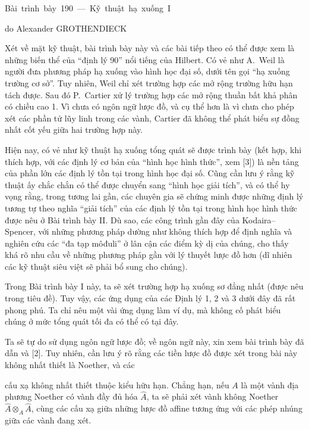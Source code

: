 \unit{Bài trình bày 190 — Kỹ thuật hạ xuống I}
%
  {do Alexander GROTHENDIECK}

Xét về mặt kỹ thuật, bài trình bày này và các bài tiếp theo có thể được xem là
những biến thể của ``định lý 90'' nổi tiếng của Hilbert. Có vẻ như A.~Weil là
người đưa phương pháp hạ xuống vào hình học đại số, dưới tên gọi ``hạ xuống
trường cơ sở''. Tuy nhiên, Weil chỉ xét trường hợp các mở rộng trường hữu hạn
tách được. Sau đó P.~Cartier xử lý trường hợp các mở rộng thuần bất khả phân có
chiều cao 1. Vì chưa có ngôn ngữ lược đồ, và cụ thể hơn là vì chưa cho phép xét
các phần tử lũy linh trong các vành, Cartier đã không thể phát biểu sự đồng nhất
cốt yếu giữa hai trường hợp này.

Hiện nay, có vẻ như kỹ thuật hạ xuống tổng quát sẽ được trình bày (kết hợp, khi
thích hợp, với các định lý cơ bản của ``hình học hình thức'', xem [3]) là nền
tảng của phần lớn các định lý tồn tại trong hình học đại số. Cũng cần lưu ý rằng
kỹ thuật ấy chắc chắn có thể được chuyển sang ``hình học giải tích'', và có thể
hy vọng rằng, trong tương lai gần, các chuyên gia sẽ chứng minh được những định
lý tương tự theo nghĩa ``giải tích'' của các định lý tồn tại trong hình học
hình thức được nêu ở Bài trình bày II. Dù sao, các công trình gần đây của Kodaira--Spencer,
với những phương pháp dường như không thích hợp để định nghĩa và nghiên cứu các
``đa tạp môđuli'' ở lân cận các điểm kỳ dị của chúng, cho thấy khá rõ nhu cầu về
những phương pháp gần với lý thuyết lược đồ hơn (dĩ nhiên các kỹ thuật siêu việt
sẽ phải bổ sung cho chúng).

Trong Bài trình bày I này, ta sẽ xét trường hợp hạ xuống sơ đẳng nhất (được nêu
trong tiêu đề). Tuy vậy, các ứng dụng của các Định lý 1, 2 và 3 dưới đây đã rất
phong phú. Ta chỉ nêu một vài ứng dụng làm ví dụ, mà không cố phát biểu chúng ở
mức tổng quát tối đa có thể có tại đây.

Ta sẽ tự do sử dụng ngôn ngữ lược đồ; về ngôn ngữ này, xin xem bài trình bày đã
dẫn và [2]. Tuy nhiên, cần lưu ý rõ rằng các tiền lược đồ được xét trong bài này
không nhất thiết là Noether, và các

cấu xạ không nhất thiết thuộc kiểu hữu hạn. Chẳng hạn, nếu $A$ là một vành địa
phương Noether có vành đầy đủ hóa $\widehat A$, ta sẽ phải xét vành không
Noether $\widehat A\otimes_A\widehat A$, cùng các cấu xạ giữa những lược đồ
affine tương ứng với các phép nhúng giữa các vành đang xét.

